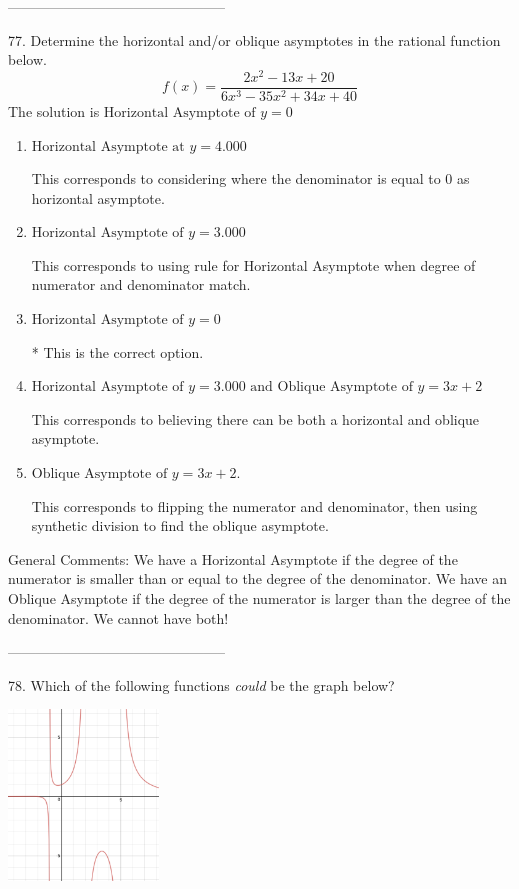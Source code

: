 \documentclass{extbook}[14pt]
\begin{document}
-----------------------------------------------

77. Determine the horizontal and/or oblique asymptotes in the rational function below.
\[ f(x) = \frac{2x^{2} -13 x + 20}{6x^{3} -35 x^{2} +34 x + 40} \] 
The solution is $ \text{Horizontal Asymptote of } y = 0 $ 

\begin{enumerate}[label=\Alph*.] 
\item $ \text{Horizontal Asymptote at } y = 4.000 $ 

 This corresponds to considering where the denominator is equal to 0 as horizontal asymptote. 
\item $ \text{Horizontal Asymptote of } y = 3.000  $ 

 This corresponds to using rule for Horizontal Asymptote when degree of numerator and denominator match. 
\item $ \text{Horizontal Asymptote of } y = 0 $ 

 * This is the correct option. 
\item $ \text{Horizontal Asymptote of } y = 3.000 \text{ and Oblique Asymptote of } y = 3x + 2 $ 

 This corresponds to believing there can be both a horizontal and oblique asymptote. 
\item $ \text{Oblique Asymptote of } y = 3x + 2. $ 

 This corresponds to flipping the numerator and denominator, then using synthetic division to find the oblique asymptote. 
\end{enumerate} 
 
General Comments: We have a Horizontal Asymptote if the degree of the numerator is smaller than or equal to the degree of the denominator. We have an Oblique Asymptote if the degree of the numerator is larger than the degree of the denominator. We cannot have both!

-----------------------------------------------

78. Which of the following functions \textit{could} be the graph below?
\begin{center} \includegraphics[width=0.3\textwidth]{../Figures/identifyGraphOfRationalFunctionA.png} \end{center} 
\end{document}
